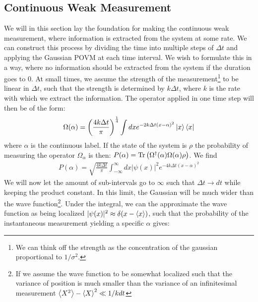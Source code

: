 \subsection{Continuous Weak Measurement}\label{sec:continuous_weak_measurement}
We will in this section lay the foundation for making the continuous weak measurement, where information is extracted from the system at some rate. We can construct this process by dividing the time into multiple steps of $\Delta t$ and applying the Gaussian POVM at each time interval. We wish to formulate this in a way, where no information should be extracted from the system if the duration goes to $0$. At small times, we assume the strength of the measurement\footnote{We can think off the strength as the concentration of the gaussian proportional to $1/\sigma^2$.} to be linear in $\Delta t$, such that the strength is determined by $k\Delta t$, where $k$ is the rate with which we extract the information. The operator applied in one time step will then be of the form:
\begin{equation}
    \Omega(\alpha) = \left(\frac{4 k \Delta t}{\pi}\right)^\frac14 \int dx e^{-2k\Delta t (x - \alpha)^2} \ket{x}\bra{x}
\end{equation}
where $\alpha$ is the continuous label. If the state of the system is $\rho$ the probability of measuring the operator $\Omega_\alpha$ is then: $P(\alpha) = \Tr\left(\Omega^\dagger(\alpha) \Omega(\alpha) \rho \right)$. We find 
\begin{align}
    P(\alpha) = \sqrt{\frac{4 k \Delta t}{\pi}} \int_{-\infty}^{\infty} dx |\psi(x)|^2 e^{-4k\Delta t (x - \alpha)^2}
\end{align}
We will now let the amount of sub-intervals go to $\infty$ such that $\Delta t \to dt$ while keeping the product constant. In this limit, the Gaussian will be much wider than the wave function\footnote{If we assume the wave function to be somewhat localized such that the variance of position is much smaller than the variance of an infinitesimal measurement $\expval{X^2} - \expval{X}^2 \ll 1 / k dt$}. Under the integral, we can the approximate the wave function as being localized $|\psi(x)|^2 \approx \delta(x-\expval{x})$, such that the probability of the instantaneous measurement yielding a specific $\alpha$ gives:
